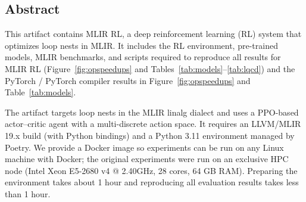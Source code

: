 \documentclass[10pt,twocolumn]{article}
\begin{document}
\subsection{Abstract}
This artifact contains MLIR RL, a deep reinforcement learning (RL) system that optimizes loop nests in MLIR. It includes the RL environment, pre-trained models, MLIR benchmarks, and scripts required to reproduce all results for MLIR RL (Figure~\ref{fig:opspeedups} and Tables~\ref{tab:models}--\ref{tab:lqcd}) and the PyTorch / PyTorch compiler results in Figure~\ref{fig:opspeedups} and Table~\ref{tab:models}.

The artifact targets loop nests in the MLIR linalg dialect and uses a PPO-based actor--critic agent with a multi-discrete action space. It requires an LLVM/MLIR 19.x build (with Python bindings) and a Python 3.11 environment managed by Poetry. We provide a Docker image so experiments can be run on any Linux machine with Docker; the original experiments were run on an exclusive HPC node (Intel Xeon E5-2680 v4 @ 2.40GHz, 28 cores, 64 GB RAM). Preparing the environment takes about 1 hour and reproducing all evaluation results takes less than 1 hour.
\end{document}
